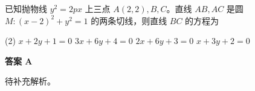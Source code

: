 \begin{choice}[source={2021八省联考}, topic={抛物线的切线与割线}]
已知抛物线 $y^2=2px$ 上三点 $A(2,2),B,C$。直线 $AB,AC$ 是圆 $M: (x-2)^2+y^2=1$ 的两条切线，则直线 $BC$ 的方程为
\begin{tasks}(2)
	\task $x+2y+1=0$
	\task $3x+6y+4=0$
	\task $2x+6y+3=0$
	\task $x+3y+2=0$
\end{tasks}
\end{choice}
\begin{choice-sol}
\textbf{答案 A}

待补充解析。
\end{choice-sol}
